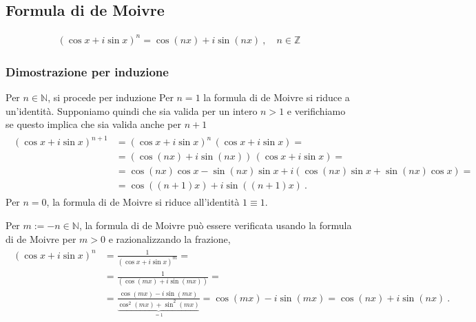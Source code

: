\documentclass[letterpaper,10pt,italian]{jupyterBook}
\begin{document}
\subsection{Formula di de Moivre}
\label{\detokenize{ch/algebra/complex-algebra-notes:formula-di-de-moivre}}\label{\detokenize{ch/algebra/complex-algebra-notes:math-hs-algebra-complex-notes-demoivre}}\begin{equation*}
\begin{split}(\cos x + i \sin x)^n = \cos(nx) + i \sin(nx) \ , \quad n \in \mathbb{Z}\end{split}
\end{equation*}\subsubsection*{Dimostrazione per induzione}

\sphinxAtStartPar
Per \(n \in \mathbb{N}\), si procede per induzione   Per \(n = 1\) la formula di de Moivre si riduce a un’identità. Supponiamo quindi che sia valida per un intero \(n > 1\) e verifichiamo se questo implica che sia valida anche per \(n+1\)
\begin{equation*}
\begin{split}\begin{aligned}
  (\cos x + i \sin x)^{n+1} & = (\cos x + i \sin x)^n \, (\cos x + i \sin x) = \\
                            & = \left(\cos (nx)+ i \sin (nx) \right) \, (\cos x + i \sin x) = \\
                            & = \cos(nx) \cos x - \sin(nx) \sin x + i \left( \cos(nx) \sin x + \sin(nx) \cos x \right) = \\
                            & = \cos( (n+1)x ) + i \sin( (n+1) x ) \ .
\end{aligned}\end{split}
\end{equation*}
\sphinxAtStartPar
Per \(n = 0\), la formula di de Moivre si riduce all’identità \(1 \equiv 1\).

\sphinxAtStartPar
Per \(m := -n \in \mathbb{N}\), la formula di de Moivre può essere verificata usando la formula di de Moivre per \(m > 0\) e razionalizzando la frazione,
\begin{equation*}
\begin{split}\begin{aligned}
  \left( \cos x + i \sin x \right)^{n} & = \frac{1}{\left( \cos x + i \sin x \right)^m} = \\
   & = \frac{1}{\left( \cos (m x) + i \sin (m x) \right)} = \\
   & = \frac{\cos( m x) - i \sin (m x)}{\underbrace{\cos^2(mx) + \sin^2(mx)}_{=1}} = \cos(mx) - i \sin(mx) = \cos(nx) + i \sin(nx) \ .
\end{aligned}\end{split}
\end{equation*}
\sphinxstepscope
\end{document}

